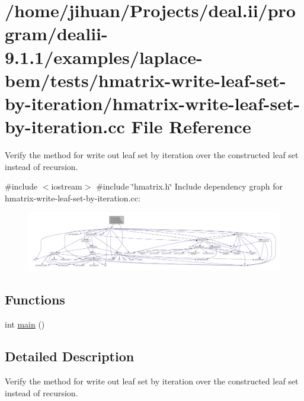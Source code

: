 \hypertarget{hmatrix-write-leaf-set-by-iteration_8cc}{}\section{/home/jihuan/\+Projects/deal.ii/program/dealii-\/9.1.1/examples/laplace-\/bem/tests/hmatrix-\/write-\/leaf-\/set-\/by-\/iteration/hmatrix-\/write-\/leaf-\/set-\/by-\/iteration.cc File Reference}
\label{hmatrix-write-leaf-set-by-iteration_8cc}


Verify the method for write out leaf set by iteration over the constructed leaf set instead of recursion.  


{\ttfamily \#include $<$iostream$>$}\newline
{\ttfamily \#include \char`\"{}hmatrix.\+h\char`\"{}}\newline
Include dependency graph for hmatrix-\/write-\/leaf-\/set-\/by-\/iteration.cc\+:\nopagebreak
\begin{figure}[H]
\begin{center}
\leavevmode
\includegraphics[width=350pt]{hmatrix-write-leaf-set-by-iteration_8cc__incl}
\end{center}
\end{figure}
\subsection*{Functions}
\begin{DoxyCompactItemize}
\item 
int \hyperlink{hmatrix-write-leaf-set-by-iteration_8cc_ae66f6b31b5ad750f1fe042a706a4e3d4}{main} ()
\end{DoxyCompactItemize}


\subsection{Detailed Description}
Verify the method for write out leaf set by iteration over the constructed leaf set instead of recursion. 

